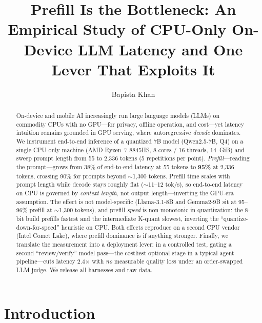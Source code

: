 \documentclass[sigconf,nonacm,10pt]{acmart}
\begin{document}
\title{Prefill Is the Bottleneck: An Empirical Study of CPU-Only
On-Device LLM Latency and One Lever That Exploits It}

\author{Bapista Khan}
\renewcommand{\shortauthors}{Bapista Khan}

\begin{abstract}
On-device and mobile AI increasingly run large language models (LLMs) on
commodity CPUs with no GPU---for privacy, offline operation, and cost---yet
latency intuition remains grounded in GPU serving, where autoregressive
\emph{decode} dominates. We instrument end-to-end inference of a quantized 7B
model (Qwen2.5-7B, Q4) on a single CPU-only machine (AMD Ryzen~7 8845HS, 8
cores / 16 threads, 14~GiB) and sweep prompt length from 55 to 2{,}336 tokens
(5 repetitions per point). \emph{Prefill}---reading the prompt---grows from
38\% of end-to-end latency at 55 tokens to \textbf{95\%} at 2{,}336 tokens,
crossing 90\% for prompts beyond $\sim$1{,}300 tokens. Prefill time scales with
prompt length while decode stays roughly flat ($\sim$11--12 tok/s), so
end-to-end latency on CPU is governed by \emph{context length}, not output
length---inverting the GPU-era assumption. The effect is not model-specific
(Llama-3.1-8B and Gemma2-9B sit at 95--96\% prefill at $\sim$1{,}300 tokens),
and prefill \emph{speed} is non-monotonic in quantization: the 8-bit build
prefills fastest and the intermediate K-quant slowest, inverting the
``quantize-down-for-speed'' heuristic on CPU. Both effects reproduce on a
second CPU vendor (Intel Comet Lake), where prefill dominance is if anything
stronger. Finally, we translate the measurement into a deployment lever: in a
controlled test, gating a second ``review/verify'' model pass---the costliest
optional stage in a typical agent pipeline---cuts latency 2.4$\times$ with
\emph{no} measurable quality loss under an order-swapped LLM judge. We release
all harnesses and raw data.
\end{abstract}


\maketitle


\section{Introduction}
\label{sec:intro}
\end{document}
